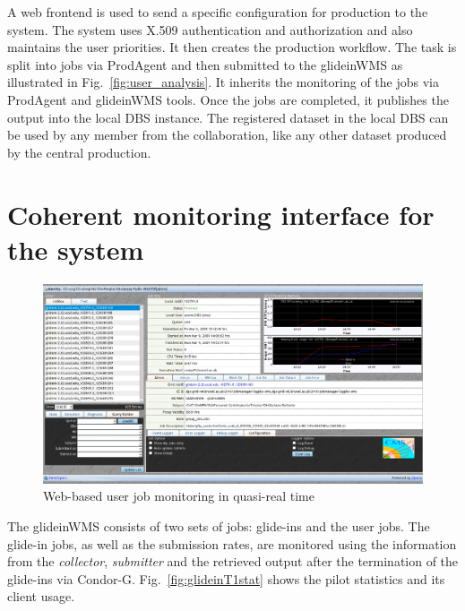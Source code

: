 \documentclass[a4paper]{jpconf}
\begin{document}
A web frontend is used to send a specific configuration for production to the system. 
The system uses X.509 authentication and authorization and also maintains the user priorities. 
It then creates the production workflow. The task is split into jobs via ProdAgent and then 
submitted to the glideinWMS as illustrated in Fig.~\ref{fig:user_analysis}. It inherits the monitoring of the 
jobs via ProdAgent and glideinWMS tools. 
Once the jobs are completed, it publishes the output into the local DBS instance. The registered 
dataset in the local DBS can be used by any member from the collaboration, like any other dataset produced 
by the central production. 

\section{Coherent monitoring interface for the system}
\begin{figure}
\begin{center}
\includegraphics[scale=0.4]{jobMon.png}
\end{center}
\caption{Web-based user job monitoring in quasi-real time}
\label{fig:jobMon}
\end{figure}
The glideinWMS consists of two sets of jobs: glide-ins and the user jobs. The
glide-in jobs, as well as the submission rates, are monitored using the information from the \emph{collector},
\emph{submitter} and the retrieved output after the termination of the glide-ins via Condor-G.
Fig.~\ref{fig:glideinT1stat} shows the pilot statistics and its client usage.
\end{document}
